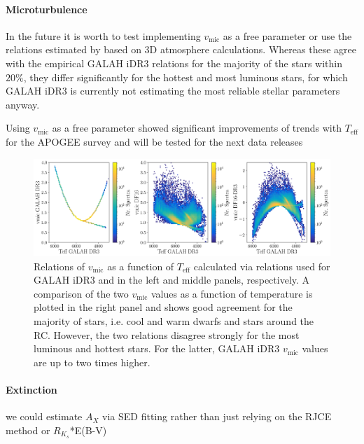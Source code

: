 \documentclass[fleqn,usenatbib,useAMS]{mnras}
\begin{document}
\paragraph*{Microturbulence} In the future it is worth to test implementing $v_\text{mic}$ as a free parameter or use the relations estimated by \citet{DutraFerreira2016} based on 3D atmosphere calculations. Whereas these agree with the empirical GALAH iDR3 relations for the majority of the stars within $20\%$, they differ significantly for the hottest and most luminous stars, for which GALAH iDR3 is currently not estimating the most reliable stellar parameters anyway.

Using $v_\text{mic}$ as a free parameter showed significant improvements of trends with $T_\text{eff}$ for the APOGEE survey \citep{Holtzman2018} and will be tested for the next data releases

\begin{figure}
\centering
\includegraphics[width=\textwidth]{figures/Vmic_comparisons.png}
\caption[{Comparison of $v_\text{mic}$ calculated via relations used for GALAH iDR3 and \citet{DutraFerreira2016}}]{Relations of $v_\text{mic}$ as a function of $T_\text{eff}$ calculated via relations used for GALAH iDR3 and \citet{DutraFerreira2016} in the left and middle panels, respectively. A comparison of the two $v_\text{mic}$ values as a function of temperature is plotted in the right panel and shows good agreement for the majority of stars, i.e. cool and warm dwarfs and stars around the RC. However, the two relations disagree strongly for the most luminous and hottest stars. For the latter, GALAH iDR3 $v_\text{mic}$ values are up to two times higher.}
\label{fig:vmic_comparison}
\end{figure}

\paragraph*{Extinction} we could estimate $A_X$ via SED fitting rather than just relying on the RJCE method or $R_{K_s}$*E(B-V)
\end{document}
